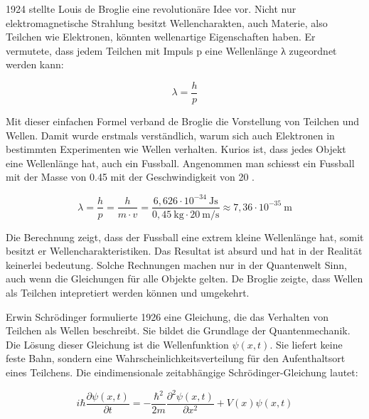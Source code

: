 	
	1924 stellte Louis de Broglie eine revolutionäre Idee vor.
	Nicht nur elektromagnetische Strahlung besitzt Wellencharakten, auch Materie, also Teilchen wie Elektronen, könnten wellenartige Eigenschaften haben.
	Er vermutete, dass jedem Teilchen mit Impuls p eine Wellenlänge λ zugeordnet werden kann:
	
	\begin{equation}
		\lambda = \frac{h}{p}
	\end{equation}	
	
	Mit dieser einfachen Formel verband de Broglie die Vorstellung von Teilchen und Wellen. Damit wurde erstmals verständlich, warum sich auch Elektronen in bestimmten Experimenten wie Wellen verhalten.
	Kurios ist, dass jedes Objekt eine Wellenlänge hat, auch ein Fussball.
	Angenommen man schiesst ein Fussball mit der Masse von 0.45  mit der Geschwindigkeit von 20 .
	
	\begin{equation}
		\lambda = \frac{h}{p} = \frac{h}{m \cdot v} = 	\frac{6{,}626 \cdot 10^{-34} \ \text{Js}}{0{,}45 \ \text{kg} \cdot 20 \ \text{m/s}} \approx 7{,}36 \cdot 10^{-35} \ \text{m}
	\end{equation}	
	
	Die Berechnung zeigt, dass der Fussball eine extrem kleine Wellenlänge hat, somit besitzt er Wellencharakteristiken.
	Das Resultat ist absurd und hat in der Realität keinerlei bedeutung.
	Solche Rechnungen machen nur in der Quantenwelt Sinn, auch wenn die Gleichungen für alle Objekte gelten. 
	De Broglie zeigte, dass Wellen als Teilchen intepretiert werden können und umgekehrt. 
	
	
	
	Erwin Schrödinger formulierte 1926 eine Gleichung, die das Verhalten von Teilchen als Wellen beschreibt. 
	Sie bildet die Grundlage der Quantenmechanik. Die Lösung dieser Gleichung ist die Wellenfunktion \( \psi(x, t) \). Sie liefert keine feste Bahn, sondern eine Wahrscheinlichkeitsverteilung für den Aufenthaltsort eines Teilchens.  
	Die eindimensionale zeitabhängige Schrödinger-Gleichung lautet:
	
	\begin{equation}\label{fourier:equation:zeitabhaengigeSchroedingerGleichung}
		i \hbar \frac{\partial \psi(x,t)}{\partial t} = -\frac{\hbar^2}{2m} \frac{\partial^2 \psi(x,t)}{\partial x^2} + V(x) \psi(x,t)
	\end{equation}
	
